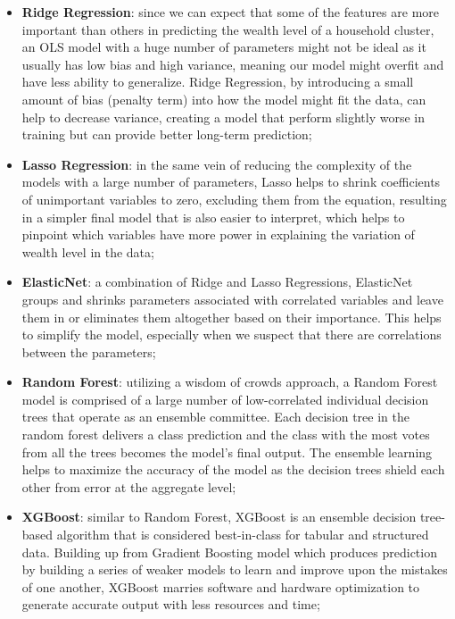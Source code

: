 \documentclass[solid,math,chem,code,plot,gloss]{bmc}
\begin{document}
\begin{itemize}
    \item \textbf{Ridge Regression}: since we can expect that some of the features are more important than others in predicting the wealth level of a household cluster, an OLS model with a huge number of parameters might not be ideal as it usually has low bias and high variance, meaning our model might overfit and have less ability to generalize. Ridge Regression, by introducing a small amount of bias (penalty term) into how the model might fit the data, can help to decrease variance, creating a model that perform slightly worse in training but can provide better long-term prediction;
    \item \textbf{Lasso Regression}: in the same vein of reducing the complexity of the models with a large number of parameters, Lasso helps to shrink coefficients of unimportant variables to zero, excluding them from the equation, resulting in a simpler final model that is also easier to interpret, which helps to pinpoint which variables have more power in explaining the variation of wealth level in the data;  
    \item \textbf{ElasticNet}: a combination of Ridge and Lasso Regressions, ElasticNet groups and shrinks parameters associated with correlated variables and leave them in or eliminates them altogether based on their importance. This helps to simplify the model, especially when we suspect that there are correlations between the parameters; 
    \item \textbf{Random Forest}: utilizing a wisdom of crowds approach, a Random Forest model is comprised of a large number of low-correlated individual decision trees that operate as an ensemble committee. Each decision tree in the random forest delivers a class prediction and the class with the most votes from all the trees becomes the model’s final output. The ensemble learning helps to maximize the accuracy of the model as the decision trees shield each other from error at the aggregate level; 
    \item \textbf{XGBoost}: similar to Random Forest, XGBoost is an ensemble decision tree-based algorithm that is considered best-in-class for tabular and structured data. Building up from Gradient Boosting model which produces prediction by building a series of weaker models to learn and improve upon the mistakes of one another, XGBoost marries software and hardware optimization to generate accurate output with less resources and time;
\end{itemize}
\end{document}

